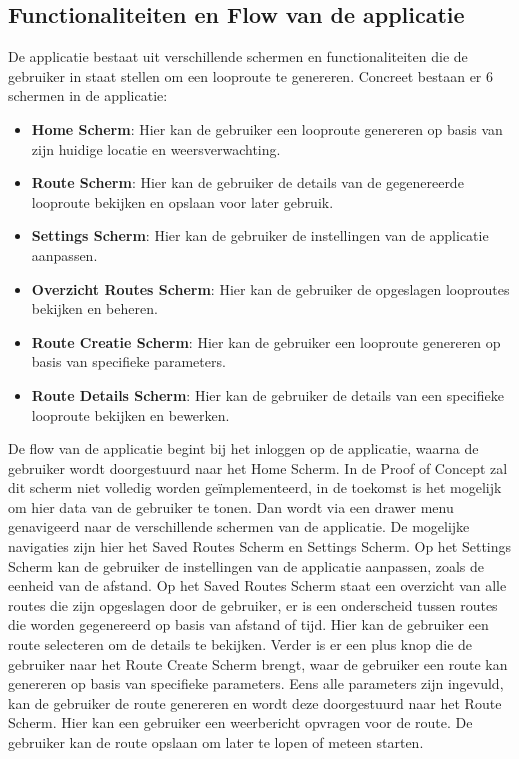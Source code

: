 \subsection{Functionaliteiten en Flow van de applicatie}

De applicatie bestaat uit verschillende schermen en functionaliteiten die de gebruiker in staat stellen om een looproute te genereren. Concreet bestaan er 6 schermen in de applicatie:

\vspace{1cm}


\begin{itemize}
    \item \textbf{Home Scherm}: Hier kan de gebruiker een looproute genereren op basis van zijn huidige locatie en weersverwachting.
    \item \textbf{Route Scherm}: Hier kan de gebruiker de details van de gegenereerde looproute bekijken en opslaan voor later gebruik.
    \item \textbf{Settings Scherm}: Hier kan de gebruiker de instellingen van de applicatie aanpassen.
    \item \textbf{Overzicht Routes Scherm}: Hier kan de gebruiker de opgeslagen looproutes bekijken en beheren.
    \item \textbf{Route Creatie Scherm}: Hier kan de gebruiker een looproute genereren op basis van specifieke parameters.
    \item \textbf{Route Details Scherm}: Hier kan de gebruiker de details van een specifieke looproute bekijken en bewerken.
\end{itemize}

\vspace{1cm}


De flow van de applicatie begint bij het inloggen op de applicatie, waarna de gebruiker wordt doorgestuurd naar het Home Scherm. In de Proof of Concept zal dit scherm niet volledig worden geïmplementeerd, in de toekomst is het mogelijk om hier data van de gebruiker te tonen. Dan wordt via een drawer menu genavigeerd naar de verschillende schermen van de applicatie. De mogelijke navigaties zijn hier het Saved Routes Scherm en Settings Scherm. Op het Settings Scherm kan de gebruiker de instellingen van de applicatie aanpassen, zoals de eenheid van de afstand. Op het Saved Routes Scherm staat een overzicht van alle routes die zijn opgeslagen door de gebruiker, er is een onderscheid tussen routes die worden gegenereerd op basis van afstand of tijd. Hier kan de gebruiker een route selecteren om de details te bekijken. Verder is er een plus knop die de gebruiker naar het Route Create Scherm brengt, waar de gebruiker een route kan genereren op basis van specifieke parameters. Eens alle parameters zijn ingevuld, kan de gebruiker de route genereren en wordt deze doorgestuurd naar het Route Scherm. Hier kan een gebruiker een weerbericht opvragen voor de route. De gebruiker kan de route opslaan om later te lopen of meteen starten.

